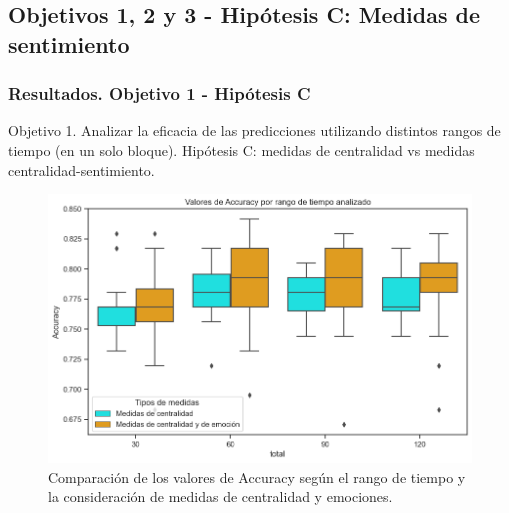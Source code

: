 \documentclass{beamer}
\begin{document}
\subsection{Objetivos 1, 2 y 3 - Hipótesis C: Medidas de sentimiento}
\begin{frame}
	\frametitle{Resultados. Objetivo 1 - Hipótesis C}
	\begin{block}{Objetivo 1. Analizar la eficacia de las predicciones utilizando distintos rangos de tiempo (en un solo bloque).}
		Hipótesis C: medidas de centralidad vs medidas centralidad-sentimiento.
	\end{block}
	
\begin{figure}[H]
	\centering
	\includegraphics[width=0.7\linewidth]{figs/cap6/figura_32}
	\caption{Comparación de los valores de Accuracy según el rango de tiempo y la consideración de medidas de centralidad y emociones.}
	
	\label{fig:figura33}
\end{figure}


	
\end{frame}
\end{document}
